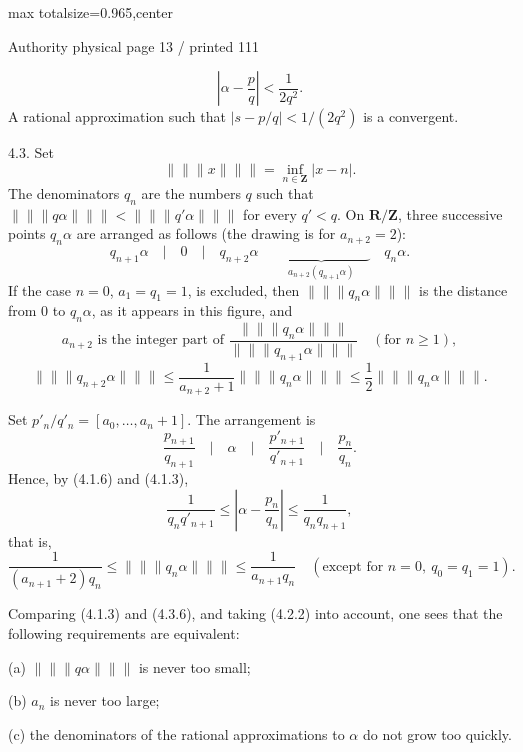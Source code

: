 \documentclass{article}
\begin{document}
\newpage
\noindent\begin{adjustbox}{max totalsize={\textwidth}{0.965\textheight},center}\begin{minipage}{\textwidth}
\noindent\hfill\scriptsize Authority physical page 13 / printed 111\par\normalsize
\[
\left|\alpha-\frac pq\right|<\frac1{2q^2}.
\]
A rational approximation such that \(\left|s-p/q\right|<1/(2q^2)\) is a convergent.

4.3. Set
\[
\lVert\!\lVert\!\lVert x\rVert\!\rVert\!\rVert=\inf_{n\in\mathbf Z}|x-n|.
\]
The denominators \(q_n\) are the numbers \(q\) such that \(\lVert\!\lVert\!\lVert q\alpha\rVert\!\rVert\!\rVert<\lVert\!\lVert\!\lVert q'\alpha\rVert\!\rVert\!\rVert\) for every \(q'<q\). On \(\mathbf R/\mathbf Z\), three successive points \(q_n\alpha\) are arranged as follows (the drawing is for \(a_{n+2}=2\)):
\[
\tag{4.3.1}
q_{n+1}\alpha\quad\big|\quad0\quad\big|\quad q_{n+2}\alpha
\quad\underbrace{\hspace{7em}}_{a_{n+2}(q_{n+1}\alpha)}\quad q_n\alpha.
\]
If the case \(n=0\), \(a_1=q_1=1\), is excluded, then \(\lVert\!\lVert\!\lVert q_n\alpha\rVert\!\rVert\!\rVert\) is the distance from \(0\) to \(q_n\alpha\), as it appears in this figure, and
\[
\tag{4.3.2}
a_{n+2}\text{ is the integer part of }
\frac{\lVert\!\lVert\!\lVert q_n\alpha\rVert\!\rVert\!\rVert}{\lVert\!\lVert\!\lVert q_{n+1}\alpha\rVert\!\rVert\!\rVert}
\quad(\text{for }n\geq1),
\]
\[
\tag{4.3.3}
\lVert\!\lVert\!\lVert q_{n+2}\alpha\rVert\!\rVert\!\rVert
\leq\frac1{a_{n+2}+1}\lVert\!\lVert\!\lVert q_n\alpha\rVert\!\rVert\!\rVert
\leq\frac12\lVert\!\lVert\!\lVert q_n\alpha\rVert\!\rVert\!\rVert.
\]

Set \(p'_n/q'_n=[a_0,\ldots,a_n+1]\). The arrangement is
\[
\tag{4.3.4}
\frac{p_{n+1}}{q_{n+1}}\quad\big|\quad\alpha\quad\big|\quad
\frac{p'_{n+1}}{q'_{n+1}}\quad\big|\quad\frac{p_n}{q_n}.
\]
Hence, by (4.1.6) and (4.1.3),
\[
\tag{4.3.5}
\frac1{q_nq'_{n+1}}\leq\left|\alpha-\frac{p_n}{q_n}\right|
\leq\frac1{q_nq_{n+1}},
\]
that is,
\[
\tag{4.3.6}
\frac1{(a_{n+1}+2)q_n}\leq
\lVert\!\lVert\!\lVert q_n\alpha\rVert\!\rVert\!\rVert
\leq\frac1{a_{n+1}q_n}
\quad(\text{except for }n=0,\ q_0=q_1=1).
\]

Comparing (4.1.3) and (4.3.6), and taking (4.2.2) into account, one sees that the following requirements are equivalent:

(a) \(\lVert\!\lVert\!\lVert q\alpha\rVert\!\rVert\!\rVert\) is never too small;

(b) \(a_n\) is never too large;

(c) the denominators of the rational approximations to \(\alpha\) do not grow too quickly.
\end{minipage}\end{adjustbox}
\end{document}
